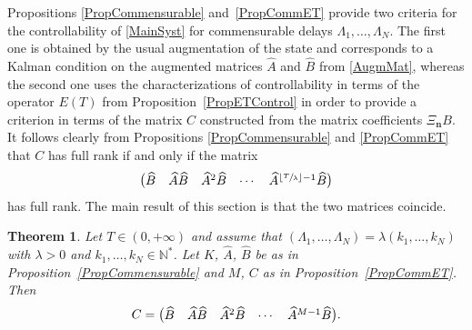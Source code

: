 \documentclass[JEP,XML,SOM,Unicode]{cedram}
\newcommand{\bn}{\boldsymbol{n}}
\renewenvironment{bmatrix}{\bigl(\begin{matrix}}{\end{matrix}\bigr)}
\theoremstyle{plain}
\newtheorem{theo}{Theorem}[section]
\theoremstyle{definition}
\newcommand{\floor}[1]{\left\lfloor #1 \right\rfloor}
\begin{document}
Propositions \ref{PropCommensurable} and~\ref{PropCommET} provide two criteria for the controllability of \eqref{MainSyst} for commensurable delays $\Lambda_1, \dots, \Lambda_N$. The first one is obtained by the usual augmentation of the state and corresponds to a Kalman condition on the augmented matrices $\widehat A$ and $\widehat B$ from \eqref{AugmMat}, whereas the second one uses the characterizations of controllability in terms of the operator $E(T)$ from Proposition~\ref{PropETControl} in order to provide a criterion in terms of the matrix $C$ constructed from the matrix coefficients $\Xi_{\bn} B$. It follows clearly from Propositions \ref{PropCommensurable} and \ref{PropCommET} that $C$ has full rank if and only if the matrix
\[
\begin{bmatrix}
\widehat B & \widehat A \widehat B & \widehat A^2 \widehat B & \cdots & \widehat A^{\floor{\sfrac{T}{\lambda}}-1} \widehat B
\end{bmatrix}
\]
has full rank. The main result of this section is that the two matrices coincide.

\begin{theo}
\label{TheoCommens}
Let $T \in (0, +\infty)$ and assume that $(\Lambda_1, \dots, \Lambda_N) = \lambda (k_1, \dots, k_N)$ with $\lambda > 0$ and $k_1, \dots,  k_N \in \mathbb N^\ast$. Let $K$, $\widehat A$, $\widehat B$ be as in Proposition~\ref{PropCommensurable} and $M$, $C$ as in Proposition~\ref{PropCommET}. Then
\[C = \begin{bmatrix}\widehat B & \widehat A \widehat B & \widehat A^2 \widehat B & \cdots & \widehat A^{M-1} \widehat B\end{bmatrix}.\]
\end{theo}
\end{document}
